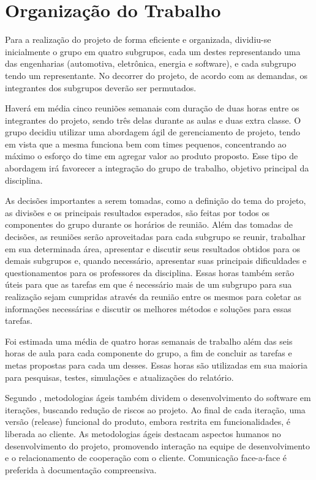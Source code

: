 \chapter[Organização do Trabalho]{Organização do Trabalho}

Para a realização do projeto de forma eficiente e organizada, dividiu-se inicialmente o grupo em quatro subgrupos, cada um destes representando uma das 
engenharias (automotiva, eletrônica, energia e software), e cada subgrupo tendo um representante. No decorrer do projeto, de acordo com as demandas, os 
integrantes dos subgrupos deverão ser permutados. 

Haverá em média cinco reuniões semanais com duração de duas horas entre os integrantes do projeto, sendo três delas durante as aulas e duas extra classe.
O grupo decidiu utilizar uma abordagem ágil de gerenciamento de projeto, tendo em vista que a mesma funciona bem com times pequenos, concentrando ao máximo
o esforço do time em agregar valor ao produto proposto. Esse tipo de abordagem irá favorecer a integração do grupo de trabalho, objetivo principal da disciplina.

As decisões importantes a serem tomadas, como a definição do tema do projeto, as divisões e os principais resultados esperados, são feitas por 
todos os componentes do grupo durante os horários de reunião. Além das tomadas de decisões, as reuniões serão aproveitadas para cada subgrupo se reunir, 
trabalhar em sua determinada área, apresentar e discutir seus resultados obtidos para os demais subgrupos e, quando necessário, apresentar suas principais 
dificuldades e questionamentos para os professores da disciplina. Essas horas também serão úteis para que as tarefas em que é necessário mais de um subgrupo 
para sua realização sejam cumpridas através da reunião entre os mesmos para coletar as informações necessárias e discutir os melhores métodos e soluções para 
essas tarefas.

Foi estimada uma média de quatro horas semanais de trabalho além das seis horas de aula para cada componente do grupo, a fim de concluir as tarefas e metas 
propostas para cada um desses. Essas horas são utilizadas em sua maioria para pesquisas, testes, simulações e atualizações do relatório. 

Segundo \cite{XPxRUP2006}, metodologias ágeis também dividem o desenvolvimento do software em iterações, buscando redução de riscos ao projeto. Ao final de cada iteração, uma versão (release) funcional do produto, embora restrita em funcionalidades, é liberada ao cliente. As metodologias ágeis destacam aspectos humanos no desenvolvimento do projeto, promovendo interação na equipe de desenvolvimento e o relacionamento de cooperação com o cliente. Comunicação face-a-face é preferida à documentação compreensiva.

